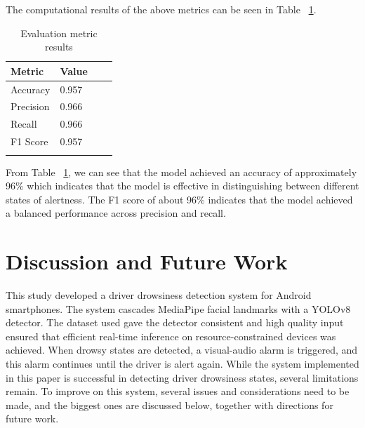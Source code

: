 \documentclass[pdflatex,sn-mathphys-num]{sn-jnl}
\theoremstyle{thmstyleone}%
\theoremstyle{thmstyletwo}%
\theoremstyle{thmstylethree}%
\begin{document}
	The computational results of the above metrics can be seen in Table ~\ref{evaluation_metric_results}.
	
	\begin{table}[h]
		\caption{Evaluation metric results}\label{evaluation_metric_results}%
		\begin{tabular}{@{}llll@{}}
			\toprule
			Metric & Value  \\
			\midrule
			Accuracy    & 0.957  \\
			Precision    & 0.966  \\
			Recall    & 0.966  \\
			F1 Score    & 0.957  \\
			\botrule
		\end{tabular}
	\end{table}
	From Table ~\ref{evaluation_metric_results}, we can see that the model achieved an accuracy of approximately 96\% which indicates that the model is effective in distinguishing between different states of alertness. The F1 score of about 96\% indicates that the model achieved a balanced performance across precision and recall. 
	
	
	
	\section{Discussion and Future Work}\label{sec:future}
	This study developed a driver drowsiness detection system for Android smartphones. The system cascades MediaPipe facial landmarks with a YOLOv8 detector. The dataset used gave the detector consistent and high quality input ensured that efficient real-time inference on resource-constrained devices was achieved. When drowsy states are detected, a visual-audio alarm is triggered, and this alarm continues until the driver is alert again.
	While the system implemented in this paper is successful in detecting driver drowsiness states, several limitations remain. To improve on this system, several issues and considerations need to be made, and the biggest ones are discussed below, together with directions for future work.
	
\end{document}
